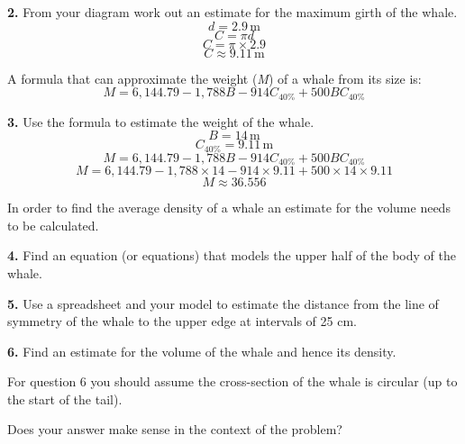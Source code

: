 \documentclass[fleqn]{article}
\newcommand{\unit}[1]{\ensuremath{\, \mathrm{#1}}}
\begin{document}
\textbf{2.} From your diagram work out an estimate for the maximum girth of the whale.
\begin{equation*}
  d = 2.9\unit{m}
\end{equation*}
\begin{equation*}
  C = \pi d
\end{equation*}
\begin{equation*}
  C = \pi \times 2.9
\end{equation*}
\begin{equation*}
  C \approx 9.11\unit{m}
\end{equation*}
\smallskip

A formula that can approximate the weight (\textit{M}) of a whale from its size is:
\begin{equation*}
  M = 6,144.79 - 1,788B - 914C_{40\%}+500BC_{40\%}
\end{equation*}
\smallskip

\textbf{3.} Use the formula to estimate the weight of the whale.
\begin{equation*}
  B = 14\unit{m}
\end{equation*}
\begin{equation*}
  C_{40\%} = 9.11\unit{m}
\end{equation*}
\begin{equation*}
  M = 6,144.79 - 1,788B - 914C_{40\%}+500BC_{40\%}
\end{equation*}
\begin{equation*}
  M = 6,144.79 - 1,788 \times 14 - 914 \times 9.11 + 500 \times 14 \times 9.11
\end{equation*}
\begin{equation*}
  M \approx 36.556
\end{equation*}
\smallskip

In order to find the average density of a whale an estimate for the volume needs to be calculated.

\textbf{4.}	Find an equation (or equations) that models the upper half of the body of the whale.

\textbf{5.}	Use a spreadsheet and your model to estimate the distance from the line of symmetry of the whale to the upper edge at intervals of 25 cm.

\textbf{6.}	Find an estimate for the volume of the whale and hence its density.  

For question 6 you should assume the cross-section of the whale is circular (up to the start of the tail).

	Does your answer make sense in the context of the problem?
\end{document}
